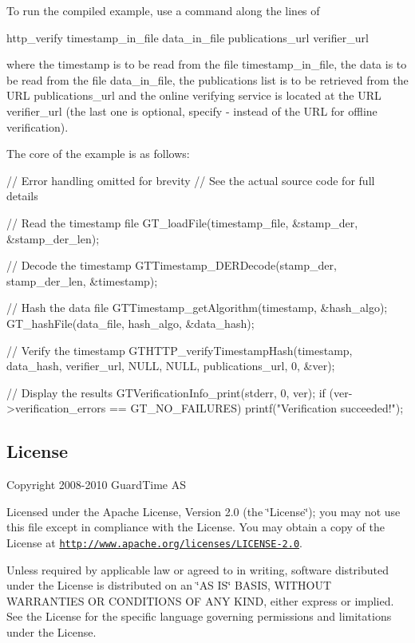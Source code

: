 To run the compiled example, use a command along the lines of 
\begin{DoxyCode}
        http_verify timestamp_in_file data_in_file publications_url verifier_url
\end{DoxyCode}
 where the timestamp is to be read from the file {\ttfamily timestamp\_\-in\_\-file}, the data is to be read from the file {\ttfamily data\_\-in\_\-file}, the publications list is to be retrieved from the URL {\ttfamily publications\_\-url} and the online verifying service is located at the URL {\ttfamily verifier\_\-url} (the last one is optional, specify {\ttfamily -\/} instead of the URL for offline verification).

The core of the example is as follows: 
\begin{DoxyCode}
        // Error handling omitted for brevity
        // See the actual source code for full details

        // Read the timestamp file
        GT_loadFile(timestamp_file, &stamp_der, &stamp_der_len);

        // Decode the timestamp
        GTTimestamp_DERDecode(stamp_der, stamp_der_len, &timestamp);

        // Hash the data file
        GTTimestamp_getAlgorithm(timestamp, &hash_algo);
        GT_hashFile(data_file, hash_algo, &data_hash);

        // Verify the timestamp
        GTHTTP_verifyTimestampHash(timestamp, data_hash,
                verifier_url, NULL, NULL, publications_url, 0, &ver);

        // Display the results
        GTVerificationInfo_print(stderr, 0, ver);
        if (ver->verification_errors == GT_NO_FAILURES) {
                printf("Verification succeeded!\n");
        }
\end{DoxyCode}


\subsection*{License}

Copyright 2008-\/2010 GuardTime AS

Licensed under the Apache License, Version 2.0 (the \char`\"{}License\char`\"{}); you may not use this file except in compliance with the License. You may obtain a copy of the License at \href{http://www.apache.org/licenses/LICENSE-2.0}{\tt http://www.apache.org/licenses/LICENSE-\/2.0}.

Unless required by applicable law or agreed to in writing, software distributed under the License is distributed on an \char`\"{}AS IS\char`\"{} BASIS, WITHOUT WARRANTIES OR CONDITIONS OF ANY KIND, either express or implied. See the License for the specific language governing permissions and limitations under the License.

